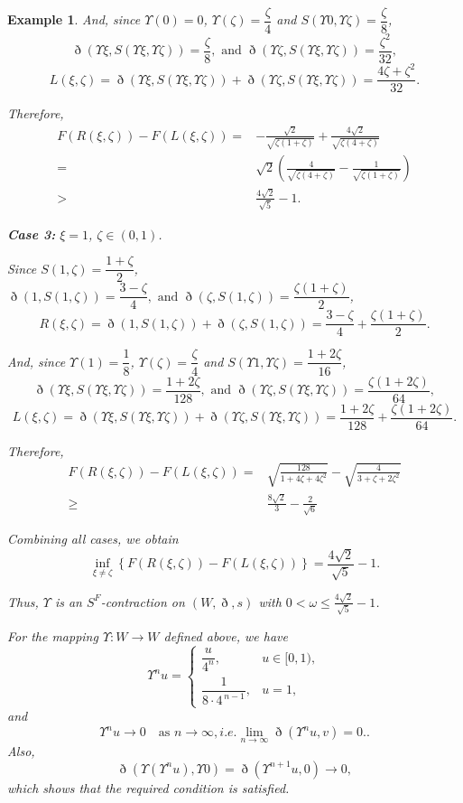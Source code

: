 \documentclass[pdflatex,sn-mathphys-num]{sn-jnl}%
\theoremstyle{thmstyleone}%
\theoremstyle{thmstyletwo}%
\newtheorem{example}{Example}%
\theoremstyle{thmstylethree}%
\begin{document}
\begin{example}
And, since $\Upsilon(0)=0$, $\Upsilon(\zeta)=\dfrac{\zeta }{4}$ and $S(\Upsilon 0,\Upsilon \zeta)=\dfrac{\zeta }{8}$,
\[
\eth(\Upsilon \xi,S(\Upsilon \xi,\Upsilon \zeta))=\frac{\zeta }{8},
\text{ and }
\eth(\Upsilon \zeta,S(\Upsilon \xi,\Upsilon \zeta))=\frac{\zeta^ 2}{32},
\]
\[
L(\xi ,\zeta)=\eth(\Upsilon \xi,S(\Upsilon \xi,\Upsilon \zeta))+\eth(\Upsilon \zeta,S(\Upsilon \xi,\Upsilon \zeta))
=
\frac{4\zeta+ \zeta ^2}{32}.
\]

Therefore,
\begin{align*}
F(R(\xi ,\zeta))-F(L(\xi ,\zeta))
=&-\frac{\sqrt{2}}{\sqrt{\zeta (1+\zeta)}}
+\frac{4\sqrt{2}}{\sqrt{\zeta (4+\zeta)}}\\
=&\sqrt{2}
\left(
\frac{4}{\sqrt{\zeta (4+\zeta)}}
-
\frac{1}{\sqrt{\zeta (1+\zeta)}}
\right)\\
>& \frac{4\sqrt{2}}{\sqrt{5}}-1.
\end{align*}

\medskip
\textbf{Case 3:} $\xi =1$, $\zeta \in (0,1)$.

Since $S(1,\zeta)=\dfrac{1+\zeta }{2}$, 
$\eth(1,S(1,\zeta))=\dfrac{3-\zeta}{4},
\text{ and }
\eth(\zeta ,S(1,\zeta))=\dfrac{\zeta (1+\zeta)}{2}$,
\[
R(\xi ,\zeta)=\eth(1,S(1,\zeta))+\eth(\zeta ,S(1,\zeta))
=
\frac{3-\zeta}{4}
+
\frac{\zeta (1+\zeta)}{2}.
\]

And, since $\Upsilon(1)=\dfrac{1}{8}$, $\Upsilon(\zeta)=\dfrac{\zeta }{4}$ and 
$S(\Upsilon 1,\Upsilon \zeta)=\dfrac{1+2\zeta}{16}$,
\[
\eth(\Upsilon \xi,S(\Upsilon \xi,\Upsilon \zeta))=\frac{1+2\zeta}{128},
\text{ and }
\eth(\Upsilon \zeta,S(\Upsilon \xi,\Upsilon \zeta))=\frac{\zeta (1+2\zeta)}{64},
\]
\[
L(\xi ,\zeta)=\eth(\Upsilon \xi,S(\Upsilon \xi,\Upsilon \zeta))+\eth(\Upsilon \zeta,S(\Upsilon \xi,\Upsilon \zeta))
=
\frac{1+2\zeta}{128}
+
\frac{\zeta (1+2\zeta)}{64}.
\]

Therefore, 
\begin{align}
    F(R(\xi ,\zeta))-F(L(\xi ,\zeta))=&\sqrt{\frac{128}{1+4\zeta+ 4\zeta^ 2}}-\sqrt{\frac{4}{3+\zeta +2\zeta^ 2}}\\
    \ge& \frac{8\sqrt{2}}{3}-\frac{2}{\sqrt{6}}
\end{align}

\medskip

Combining all cases, we obtain
\[
\inf_{\xi \neq \zeta}
\left\{
F(R(\xi ,\zeta))-F(L(\xi ,\zeta))
\right\}
=
\frac{4\sqrt{2}}{\sqrt{5}}-1.
\]

Thus, $\Upsilon $ is an \textit{$S^F$-contraction} on $(W,\eth,s)$ with $0<\omega  \le\frac{4\sqrt{2}}{\sqrt{5}}-1$.

For the mapping $\Upsilon :W\to W$ defined above, we have
\[
\Upsilon^n u=
\begin{cases}
\dfrac{u}{4^n}, & u\in[0,1),\\[6pt]
\dfrac{1}{8\cdot 4^{\,n-1}}, & u=1,
\end{cases}
\]
and
\[
\Upsilon^n u \to 0 \quad \text{as } n\to\infty, i.e. \lim_{n\to\infty} \eth(\Upsilon^n u,v)=0..
\]
Also,
\[
\eth(\Upsilon(\Upsilon^n u),\Upsilon  0)=\eth(\Upsilon^{n+1}u,0)\to 0,
\]
which shows that the required condition is satisfied.
\end{example}
\end{document}
